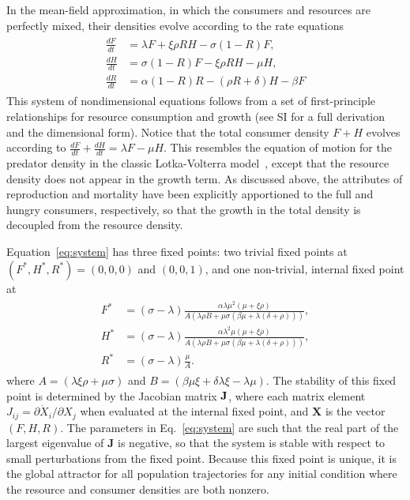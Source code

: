 \documentclass[twocolumn,preprintnumbers,amsmath,amssymb,superscriptaddress]{revtex4}
\begin{document}
\begin{bibunit}[unsrt]
In the mean-field approximation, in which the consumers and resources are perfectly mixed, their densities evolve according to the rate equations
\begin{align}
\label{eq:system}
\begin{split}
\frac{dF}{dt} &= \lambda F + \xi \rho RH - \sigma \left(1-R\right)F,  \\
\frac{dH}{dt} &= \sigma \left(1-R\right)F - \xi \rho RH - \mu H,  \\
\frac{dR}{dt} &= \alpha \left(1-R\right)R -\left(\rho R+\delta\right)H-\beta F
\end{split}
\end{align}
This system of nondimensional equations follows from a set of first-principle relationships for resource consumption and growth (see SI for a full derivation and the dimensional form).
Notice that the total consumer density $F+H$ evolves according to $\frac{dF}{dt}+\frac{dH}{dt}=\lambda F-\mu H$.
This resembles the equation of motion for the predator density in the classic Lotka-Volterra model~\cite{murray2011mathematical}, except that the resource density does not appear in the growth term.
As discussed above, the attributes of reproduction and mortality have been explicitly apportioned to the full and hungry consumers, respectively, so that the growth in the total density is decoupled from the resource density.

Equation~\eqref{eq:system} has three fixed points: two trivial fixed points at $(F^*,H^*,R^*)=(0,0,0)$ and $(0,0,1)$, and one non-trivial, internal fixed point at
\begin{align}
\label{eq:ss}
\begin{split}
F^* &= (\sigma-\lambda)\frac{ \alpha  \lambda  \mu ^2  (\mu +\xi  \rho )}{A (\lambda  \rho  B+\mu  \sigma  (\beta  \mu +\lambda  (\delta +\rho )))}, \\
H^* &= (\sigma-\lambda)\frac{ \alpha  \lambda ^2 \mu  (\mu +\xi  \rho )}{A (\lambda  \rho  B+\mu  \sigma  (\beta  \mu +\lambda  (\delta +\rho )))}, \\
R^* &= (\sigma - \lambda)\frac{\mu  }{A}.
\end{split}
\end{align}
where $A=(\lambda  \xi  \rho +\mu  \sigma )$ and $B=(\beta  \mu  \xi +\delta  \lambda  \xi -\lambda  \mu )$. The stability of this fixed point is determined by the Jacobian matrix $\bf J$, where each matrix element $J_{ij}=\partial{\dot X_i}/\partial{X_j}$ when evaluated at the internal fixed point, and $\mathbf{X}$ is the vector $(F,H,R)$.
The parameters in Eq.~\eqref{eq:system} are such that the real part of the largest eigenvalue of $\mathbf{J}$ is negative, so that the system is stable with respect to small perturbations from the fixed point.
Because this fixed point is unique, it is the global attractor for all population trajectories for any initial condition where the resource and consumer densities are both nonzero.


\end{bibunit}
\end{document}

